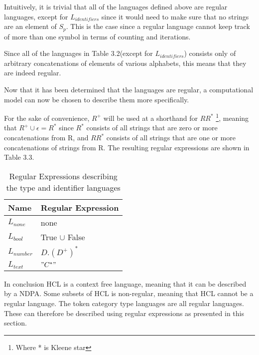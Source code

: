 Intuitively, it is trivial that all of the languages defined above are regular languages, except for $L_{identifiers}$ since it would need to make sure that no strings are an element of $S_p$.
This is the case since a regular language cannot keep track of more than one symbol in terms of counting and iterations.

Since all of the languages in Table 3.2(except for $L_{identifiers}$) consists only of arbitrary concatenations of elements of various alphabets, this means that they are indeed regular. 

Now that it has been determined that the languages are regular, a computational model can now be chosen to describe them more specifically.

For the sake of convenience, $R^+$ will be used at a shorthand for $RR^*$ \footnote{Where * is Kleene star}, meaning that $R^+ \cup \epsilon = R^*$ since $R^*$ consists of all strings that are zero or more concatenations from R, and $RR^*$ consists of all strings that are one or more concatenations of strings from R.
The resulting regular expressions are shown in Table 3.3.

\begin{table}[!htb]
	\centering
	\label{my-label}
	\begin{tabular}{|l|l|}
		\hline
		\textbf{Name}     & \textbf{Regular Expression}         \\ \hline
		$L_{none}$        & none                                \\ \hline
		$L_{bool}$        & True $\cup$ False                   \\ \hline
		$L_{number}$      & $D.(D^+)^*$                       \\ \hline
		$L_{text}$        & $"C^*"$                               \\ \hline
	\end{tabular}
	\caption{Regular Expressions describing the type and identifier languages}
\end{table}

In conclusion HCL is a context free language, meaning that it can be described by a NDPA.
Some subsets of HCL is non-regular, meaning that HCL cannot be a regular language.
The token category type languages are all regular languages. 
These can therefore be described using regular expressions as presented in this section.



